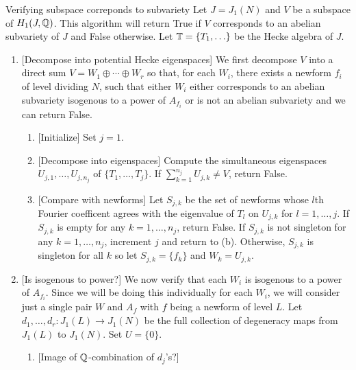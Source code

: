 \documentclass{article}
\begin{document}
\begin{algorithm}{Verifying subspace correponds to subvariety}
    Let $J=J_1(N)$ and $V$ be a subspace of $H_1(J, \mathbb{Q})$. This algorithm will
    return True if $V$ corresponds to an abelian subvariety of $J$ and
    False otherwise. Let $\mathbb{T}=\{T_1,\ldots\}$ be the Hecke algebra of $J$.
    \begin{enumerate}
        \item{} [Decompose into potential Hecke eigenspaces] 
            We first decompose $V$ into a direct sum $V=W_1\oplus \cdots \oplus
            W_r$ so that, for each $W_i$, there exists a newform $f_i$ of level
            dividing $N$, such that either $W_i$ either corresponds to an
            abelian subvariety isogenous to a power of $A_{f_i}$ or is not an
            abelian subvariety and we can return False.
            \begin{enumerate}
                \item{} [Initialize]
                    Set $j=1$.
                \item{} [Decompose into eigenspaces]
                    Compute the simultaneous eigenspaces $U_{j,1},\ldots,U_{j,
                    n_j}$ of $\{T_1,\ldots,T_j\}$. If $\sum_{k=1} ^{n_j}
                    U_{j, k}\neq V$, return False.
                \item{} [Compare with newforms]
                    Let $S_{j,k}$ be the set of newforms whose $l$th Fourier
                    coefficent agrees with the eigenvalue of $T_l$ on $U_{j,
                    k}$ for $l=1,\ldots,j$. If $S_{j, k}$ is empty for any
                    $k=1,\ldots,n_j$, return False. If $S_{j,k}$ is not
                    singleton for any $k=1,\ldots, n_j$, increment $j$ and
                    return to (b).  Otherwise, $S_{j,k}$ is singleton for all
                    $k$ so let $S_{j,k}=\{f_k\}$ and $W_k=U_{j,k}$.
            \end{enumerate}
        \item{} [Is isogenous to power?]
            We now verify that each $W_i$ is isogenous to a power of $A_{f_i}$.
            Since we will be doing this individually for each $W_i$, we will
            consider just a single pair $W$ and $A_f$ with $f$ being a newform
            of level $L$. Let $d_1,\ldots,d_r:J_1(L)\to J_1(N)$ be the full
            collection of degeneracy maps from $J_1(L)$ to $J_1(N)$.  Set
            $U=\{0\}$.
            \begin{enumerate}
                \item{} [Image of $\mathbb{Q}$-combination of $d_j$'s?]

\end{enumerate}
\end{enumerate}
\end{algorithm}
\end{document}
